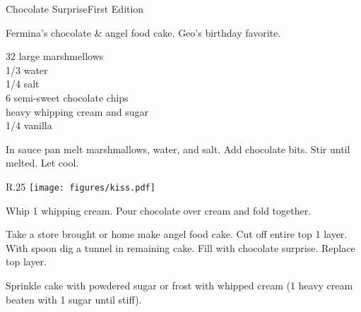 \begin{entry}{Chocolate Surprise}{First Edition}

\begin{open}
  Fermina's chocolate \& angel food cake.  Geo's birthday favorite.
\end{open}
\begin{ingredients}
  32 large marshmellows\\
  \SI{1/3}{\cup} water\\
  \SI{1/4}{\teaspoon} salt\\
  \SI{6}{\ounce} semi-sweet chocolate chips\\
  heavy whipping cream and sugar\\
  \SI{1/4}{\teaspoon} vanilla
\end{ingredients}
In sauce pan melt marshmallows, water, and salt.  Add chocolate bits.  Stir
until melted.  Let cool.

\begin{wrapfigure}{R}{.25\textwidth}
\centering\texttt{[image: figures/kiss.pdf]}
\end{wrapfigure}

Whip \SI{1}{\cup} whipping cream.  Pour chocolate over cream and fold
together.

Take a store brought or home make angel food cake.  Cut off entire top
\SI{1}{\inch} layer.  With spoon dig a tunnel in remaining cake.  Fill with
chocolate surprise.  Replace top layer.

Sprinkle cake with powdered sugar or frost with whipped cream (\SI{1}{\cup}
heavy cream beaten with \SI{1}{\tblspoon} sugar until stiff).
\end{entry}

